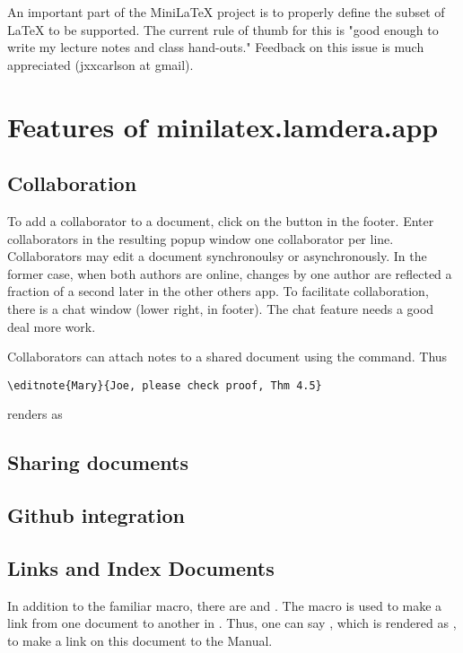  An important part of the MiniLaTeX project is to properly define the subset of LaTeX to be supported.  The current rule of thumb for this is "good enough to write my lecture notes and class hand-outs."  Feedback on this issue is much appreciated (jxxcarlson at gmail).


\section{Features of minilatex.lamdera.app}


\subsection{Collaboration} 

To add a collaborator to a document, click on the  button in the footer.  Enter collaborators in the resulting popup window one collaborator per line.  Collaborators may edit a document synchronoulsy or asynchronously.  In the former case, when both authors are online, changes by one author are reflected a fraction of a second later in the other others app.  To facilitate collaboration, there is a chat window (lower right, in footer).  The chat feature needs a good deal more work.

Collaborators can attach notes to a shared document using the  command.  Thus 

\begin{verbatim}
\editnote{Mary}{Joe, please check proof, Thm 4.5}
\end{verbatim}

renders as 


\subsection{Sharing documents}

\subsection{Github integration}

\subsection{Links and Index Documents}

In addition to the familiar  macro, there are   and .  The  macro 
is used to make a link from one document to another in .   Thus, one can say 
, which is rendered as , to make a link on this document to the Manual.

